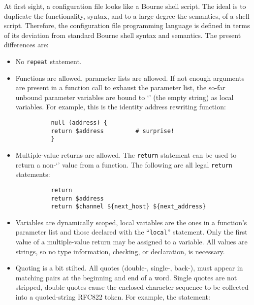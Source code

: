 At first sight, a configuration file looks like a Bourne shell script.
The ideal is to duplicate the functionality, syntax, and to a large
degree the semantics, of a shell script.  Therefore, the configuration file
programming language is defined in terms of its deviation from standard
Bourne shell syntax and semantics.  The present differences are:

\begin{itemize}
\item  No {\tt repeat} statement.
\item  Functions are allowed, parameter lists are allowed. If not enough
arguments are present in a function call to exhaust the parameter
list, the so-far unbound parameter variables are bound to `' (the
empty string) as local variables. For example, this is the identity
address rewriting function:
     
\begin{tscreen}
\begin{verbatim}
          null (address) {
          return $address         # surprise!
          }
\end{verbatim}
\end{tscreen}
\item  Multiple-value returns are allowed.  The {\tt return} statement can be
used to return a non-`' value from a function.  The following are all
legal {\tt return} statements:
     
\begin{tscreen}
\begin{verbatim}
          return
          return $address
          return $channel ${next_host} ${next_address}
\end{verbatim}
\end{tscreen}

\item  Variables are dynamically scoped, local variables are the 
ones in a function's parameter list and those declared with the 
``{\tt local}'' statement. Only the first value of a multiple-value return may 
be assigned to a variable.  All values are strings, so no type information, 
checking, or declaration, is  necessary.
\item  Quoting is a bit stilted. All quotes (double-, single-, back-), must 
appear in matching pairs at the beginning and end of a word.  Single 
quotes are not stripped, double quotes cause the enclosed character 
sequence to be collected into a quoted-string RFC822 token.  For 
example, the statement:

\begin{tscreen}
\begin{verbatim}
     

\end{verbatim}
\end{tscreen}
\end{itemize}
